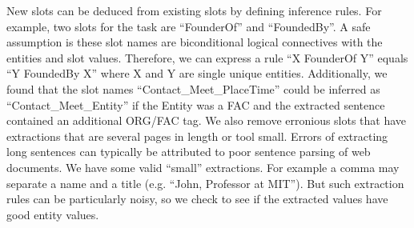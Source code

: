  New slots can be deduced from existing slots by defining inference rules. 
 For example, two slots for the task are ``FounderOf'' and ``FoundedBy''. A safe 
 assumption is these slot names are biconditional logical connectives with the 
 entities and slot values. Therefore, we can express a rule ``X FounderOf Y'' 
 equals ``Y FoundedBy X'' where X and Y are single unique entities. Additionally,
 we found that the slot names ``Contact\_Meet\_PlaceTime'' could be inferred as
 ``Contact\_Meet\_Entity'' if the Entity was a FAC and the extracted sentence 
 contained an additional ORG/FAC tag.  
We also remove erronious slots that have extractions that are several pages in 
length or tool small. Errors of extracting long sentences can typically be 
attributed to poor sentence parsing of web documents. We have some valid
``small'' extractions. For example a comma may separate a name and a title
(e.g. ``John, Professor at MIT''). But such extraction rules can be particularly 
noisy, so we check to see if the extracted values have good entity values.





